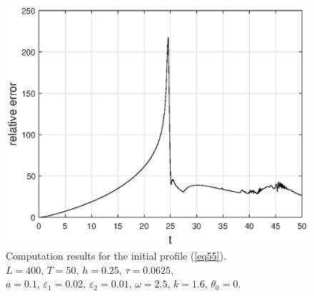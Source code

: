 \documentclass[preprint,12pt]{elsarticle}
\begin{document}
\begin{figure}[H]
\begin{center}
\begin{minipage}[h]{0.48\linewidth}
\end{minipage}
\hfill
\begin{minipage}[h]{0.48\linewidth}
\includegraphics[width=1\linewidth]{fig40.eps}
\end{minipage}
\end{center}
\caption{Computation results for the initial profile (\ref{eq55}).\\ 
\(L=400,\, T=50,\, h=0.25,\, \tau=0.0625,\)\\
\(a=0.1,\,\varepsilon_{1}=0.02,\,\varepsilon_{2}=0.01,\, \omega=2.5,\, k=1.6,\, \theta_{0}=0\).}
\label{fig50}
\end{figure}
\end{document}
